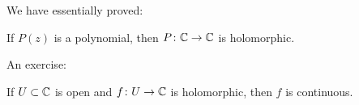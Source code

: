 \documentclass[10pt,aspectratio=169]{beamer}
\begin{document}
\begin{frame}

We have essentially proved:

\begin{proposition}
If $P(z)$ is a polynomial, then $P \colon {\mathbb{C}} \to {\mathbb{C}}$ is holomorphic.
\end{proposition}
\pause

An exercise:

\begin{proposition}
If $U \subset {\mathbb{C}}$ is open and $f \colon U \to {\mathbb{C}}$ is holomorphic, then $f$
is continuous.
\end{proposition}

\end{frame}
\end{document}
